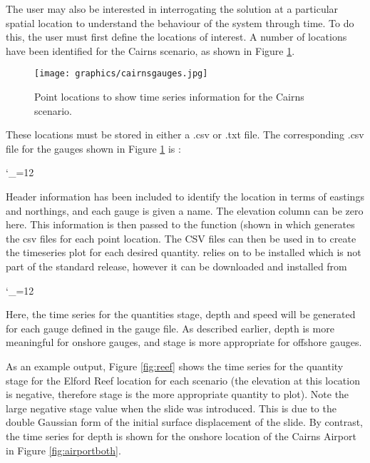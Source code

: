 \documentclass{manual}
\newcommand{\verbatiminputB}[1]{%
\endgroup}
\def\verbatiminputunderscore{\begingroup
\catcode`\_=12
\verbatiminputB}
\begin{document}
\clearpage

The user may also be interested in interrogating the solution at a particular spatial
location to understand the behaviour of the system through time. To do this, the user
must first define the locations of interest. A number of locations have been
identified for the Cairns scenario, as shown in Figure \ref{fig:cairnsgauges}.

\begin{figure}[htp]
  \centerline{\texttt{[image: graphics/cairnsgauges.jpg]}}
  \caption{Point locations to show time series information for the Cairns scenario.}
  \label{fig:cairnsgauges}
\end{figure}

These locations
must be stored in either a .csv or .txt file. The corresponding .csv file for
the gauges shown in Figure \ref{fig:cairnsgauges} is :

\verbatiminputunderscore{../../anuga_core/examples/cairns/gauges.csv}

Header information has been included to identify the location in terms of eastings and
northings, and each gauge is given a name. The elevation column can be zero here.
This information is then passed to the function  (shown in
 which generates the csv files for each point location. The CSV files
can then be used in  to create the timeseries plot for each desired
quantity.  relies on  to be installed which is not part
of the standard  release, however it can be downloaded and installed from 

\verbatiminputunderscore{../../anuga_core/examples/cairns/GetTimeseries.py}

Here, the time series for the quantities stage, depth and speed will be generated for
each gauge defined in the gauge file. As described earlier, depth is more meaningful
for onshore gauges, and stage is more appropriate for offshore gauges.

As an example output,
Figure \ref{fig:reef} shows the time series for the quantity stage for the
Elford Reef location for each scenario (the elevation at this location is negative,
therefore stage is the more appropriate quantity to plot). Note the large negative stage value when the slide was
introduced. This is due to the double Gaussian form of the initial surface
displacement of the slide. By contrast, the time series for depth is shown for the onshore location of the Cairns
Airport in Figure \ref{fig:airportboth}.
\end{document}
